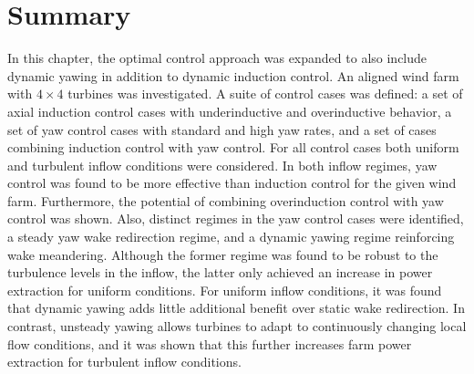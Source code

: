 \section{Summary} \label{sec:opt_yaw_concl}
In this chapter, the optimal control approach was expanded to also include dynamic yawing in addition to dynamic induction control. An aligned wind farm with $4 \times 4$ turbines was investigated. A suite of control cases was defined: a set of axial induction control cases with underinductive and overinductive behavior, a set of yaw control cases with standard and high yaw rates, and a set of cases combining induction control with yaw control. For all control cases both uniform and turbulent inflow conditions were considered. In both inflow regimes, yaw control was found to be more effective than induction control for the given wind farm. Furthermore, the potential of combining overinduction control with yaw control was shown. Also, distinct regimes in the yaw control cases were identified, a steady yaw wake redirection regime, and a dynamic yawing regime reinforcing wake meandering. Although the former regime was found to be robust to the turbulence levels in the inflow, the latter only achieved an increase in power extraction for uniform conditions. For uniform inflow conditions, it was found that dynamic yawing adds little additional benefit over static wake redirection. In contrast, unsteady yawing allows turbines to adapt to continuously changing local flow conditions, and it was shown that this further increases farm power extraction for turbulent inflow conditions. 





\cleardoublepage

